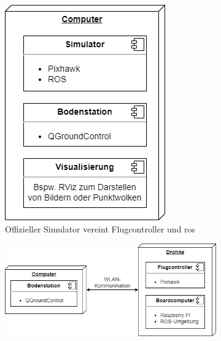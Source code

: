 \begin{figure}
    \centering
    \begin{subfigure}{0.3\linewidth}
        \includegraphics[width=\linewidth]{images/setup_simulator-Page-1.drawio.png}
        \caption{Offizieller Simulator vereint Flugcontroller und \acrshort{ros}}
        \label{fig:sim1}
        \end{subfigure}
    \hfill
    \begin{subfigure}{0.5\linewidth}
        \includegraphics[width=\linewidth]{images/setup_simulator-Page-2.drawio.png}

\end{subfigure}
\end{figure}
